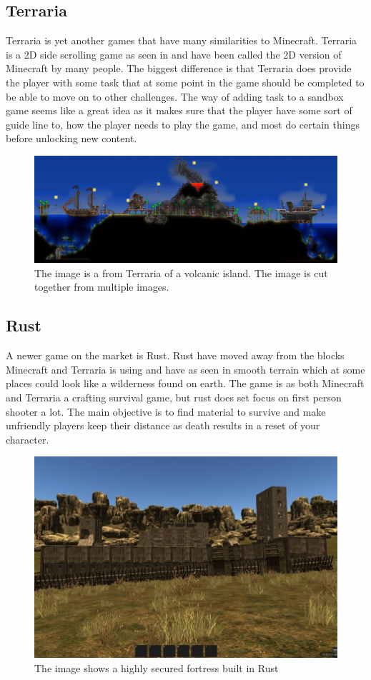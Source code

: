 \subsection{Terraria}

Terraria\cite{Terraria} is yet another games that have many similarities to Minecraft. Terraria is a 2D side scrolling game as seen in  and have been called the 2D version of Minecraft by many people. The biggest difference is that Terraria does provide the player with some task that at some point in the game should be completed to be able to move on to other challenges. The way of adding task to a sandbox game seems like a great idea as it makes sure that the player have some sort of guide line to, how the player needs to play the game, and most do certain things before unlocking new content.

\begin{figure}[H]
	\includegraphics[width=0.7\linewidth]{img/Terraria}
	\centering
	\caption{The image is a from Terraria of a volcanic island. The image is cut together from multiple images.}
	\label{fig:Terraria}
\end{figure}


\subsection{Rust}

A newer game on the market is Rust\cite{Rust}. Rust have moved away from the blocks Minecraft and Terraria is using and have as seen in smooth terrain which at some places could look like a wilderness found on earth. The game is as both Minecraft and Terraria a crafting survival game, but rust does set focus on first person shooter a lot. The main objective is to find material to survive and make unfriendly players keep their distance as death results in a reset of your character.

\begin{figure}[H]
	\includegraphics[width=0.7\linewidth]{img/Rust}
	\centering
	\caption{The image shows a highly secured fortress built in Rust}
	\label{fig:Rust}
\end{figure}


